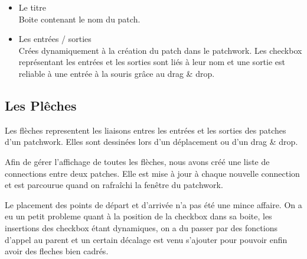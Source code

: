 \begin{itemize}
\item Le titre
  \\
  Boite contenant le nom du patch.
\item Les entr\'ees / sorties
  \\
  Cr\'ees dynamiquement \`a la cr\'eation du patch dans le patchwork. Les checkbox 
  repr\'esentant les entr\'ees et les sorties sont li\'es \`a leur nom et une sortie 
  est reliable \`a une entr\'ee \`a la souris gr\^ace au drag \& drop.
\end{itemize}

\subsection{Les Pl\^eches}
\par
Les fl\`eches representent les liaisons entres les entr\'ees et les sorties des patches 
d'un patchwork. Elles sont dessin\'ees lors d'un d\'eplacement ou d'un drag \& drop. 
\\
\par
Afin de g\'erer l'affichage de toutes les fl\`eches, nous avons cr\'e\'e une liste 
de connections entre deux patches. Elle est mise \`a jour \`a chaque nouvelle 
connection et est parcourue quand on rafra\^ichi la fen\^etre du patchwork.
\\
\par
Le placement des points de d\'epart et d'arriv\'ee n'a pas \'et\'e une mince 
affaire. On a eu un petit probleme quant \`a la position de la checkbox dans sa boite, 
les 
insertions des checkbox \'etant dynamiques, on a du passer par des fonctions d'appel au parent et un certain 
d\'ecalage est venu s'ajouter pour pouvoir enfin avoir des fleches bien cadr\'es.